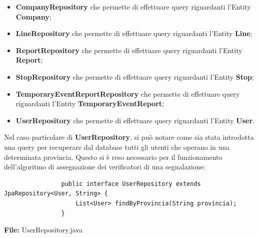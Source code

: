         \begin{itemize}
            \item \textbf{CompanyRepository} che permette di effettuare query riguardanti l'Entity \textbf{Company};
            \item \textbf{LineRepository} che permette di effettuare query riguardanti l'Entity \textbf{Line};
            \item \textbf{ReportRepository} che permette di effettuare query riguardanti l'Entity \textbf{Report};
            \item \textbf{StopRepository} che permette di effettuare query riguardanti l'Entity \textbf{Stop};
            \item \textbf{TemporaryEventReportRepository} che permette di effettuare query riguardanti l'Entity \textbf{TemporaryEventReport};
            \item \textbf{UserRepository} che permette di effettuare query riguardanti l'Entity \textbf{User}.
        \end{itemize}

        Nel caso particolare di \textbf{UserRepository}, si può notare come sia stata introdotta una query per recuperare dal database tutti gli utenti che operano in una determinata provincia. Questo si è reso necessario per il funzionamento dell'algoritmo di assegnazione dei verificatori di una segnalazione:

        \begin{code}
            \begin{verbatim}
                public interface UserRepository extends JpaRepository<User, String> {
                    List<User> findByProvincia(String provincia);
                }
            \end{verbatim}
            \caption{\textbf{File:} UserRepository.java}
        \end{code}
        


